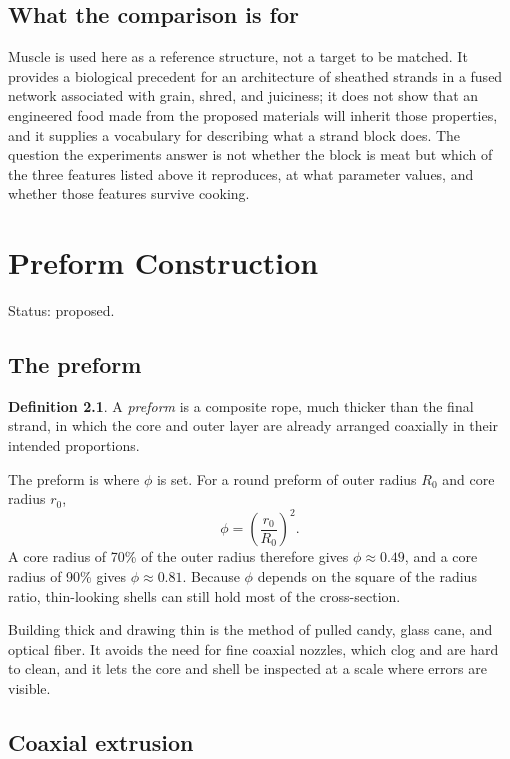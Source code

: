 \documentclass[11pt,openany]{book}
\theoremstyle{definition}
\newtheorem{definition}{Definition}[chapter]
\begin{document}
\section{What the comparison is for}

Muscle is used here as a reference structure, not a target to be matched. It provides a biological precedent for an architecture of sheathed strands in a fused network associated with grain, shred, and juiciness; it does not show that an engineered food made from the proposed materials will inherit those properties, and it supplies a vocabulary for describing what a strand block does. The question the experiments answer is not whether the block is meat but which of the three features listed above it reproduces, at what parameter values, and whether those features survive cooking.

\chapter{Preform Construction}\label{ch:preform}

Status: proposed.

\section{The preform}

\begin{definition}
A \emph{preform} is a composite rope, much thicker than the final strand, in which the core and outer layer are already arranged coaxially in their intended proportions.
\end{definition}

The preform is where $\phi$ is set. For a round preform of outer radius $R_0$ and core radius $r_0$,
\[
\phi = \left(\frac{r_0}{R_0}\right)^2 .
\]
A core radius of 70\% of the outer radius therefore gives $\phi \approx 0.49$, and a core radius of 90\% gives $\phi \approx 0.81$. Because $\phi$ depends on the square of the radius ratio, thin-looking shells can still hold most of the cross-section.

Building thick and drawing thin is the method of pulled candy, glass cane, and optical fiber. It avoids the need for fine coaxial nozzles, which clog and are hard to clean, and it lets the core and shell be inspected at a scale where errors are visible.

\section{Coaxial extrusion}
\end{document}
